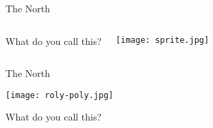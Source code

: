 \documentclass{beamer}
\newcommand{\subonefour}{The North}
\begin{document}
      \begin{frame}{\subonefour}
        \begin{columns}
            \begin{block}{What do you call this?}
            \end{block}
            \texttt{[image: sprite.jpg]}
        \end{columns}
      \end{frame}

      \begin{frame}{\subonefour}
        \begin{center}
          \texttt{[image: roly-poly.jpg]}
        \end{center}
        \begin{block}{What do you call this?}
        \end{block}
      \end{frame}
\end{document}
